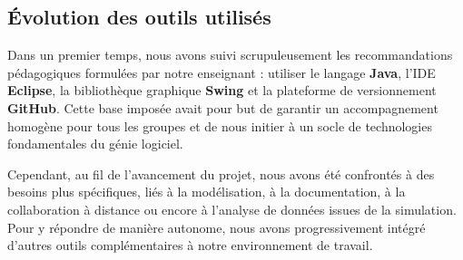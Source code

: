 \subsection{Évolution des outils utilisés}

Dans un premier temps, nous avons suivi scrupuleusement les recommandations pédagogiques formulées par notre enseignant : utiliser le langage \textbf{Java}, l’IDE \textbf{Eclipse}, la bibliothèque graphique \textbf{Swing} et la plateforme de versionnement \textbf{GitHub}. Cette base imposée avait pour but de garantir un accompagnement homogène pour tous les groupes et de nous initier à un socle de technologies fondamentales du génie logiciel.

Cependant, au fil de l’avancement du projet, nous avons été confrontés à des besoins plus spécifiques, liés à la modélisation, à la documentation, à la collaboration à distance ou encore à l’analyse de données issues de la simulation. Pour y répondre de manière autonome, nous avons progressivement intégré d’autres outils complémentaires à notre environnement de travail.

